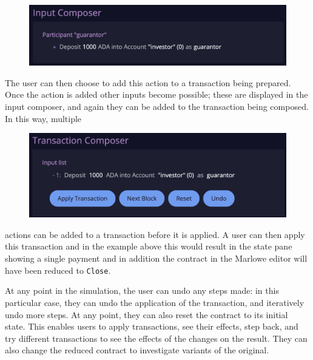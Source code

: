 \documentclass[runningheads]{llncs}
\renewcommand{\lstinline}[1]{\texttt{#1}}
\begin{document}
\begin{figure}
    \vspace*{-0.2in}
    \includegraphics[scale=0.15]{input_composer.png}
\end{figure}

\noindent
The user can then choose to add this action to a transaction being prepared. Once the action is added other inputs become possible; these are displayed in the input composer, and again they can be added to the transaction being composed. In this way, multiple %

\begin{figure}
    \vspace*{-0.2in}
    \includegraphics[scale=0.15]{tx_composer.png}
\end{figure}

\noindent
actions can be added to a transaction before it is applied.
A user can then apply this transaction and in the example above this would result in the state pane showing a single payment and in addition the contract in the Marlowe editor will have been reduced to \lstinline{Close}.

At any point in the simulation, the user can undo any steps made: in this particular case, they can undo the application of the transaction, and iteratively undo more steps. At any point, they can also reset the contract to its initial state. This enables users to apply transactions, see their effects, step back, and try different transactions to see the effects of the changes on the result. They can also change the reduced contract to investigate variants of the original.
\end{document}
